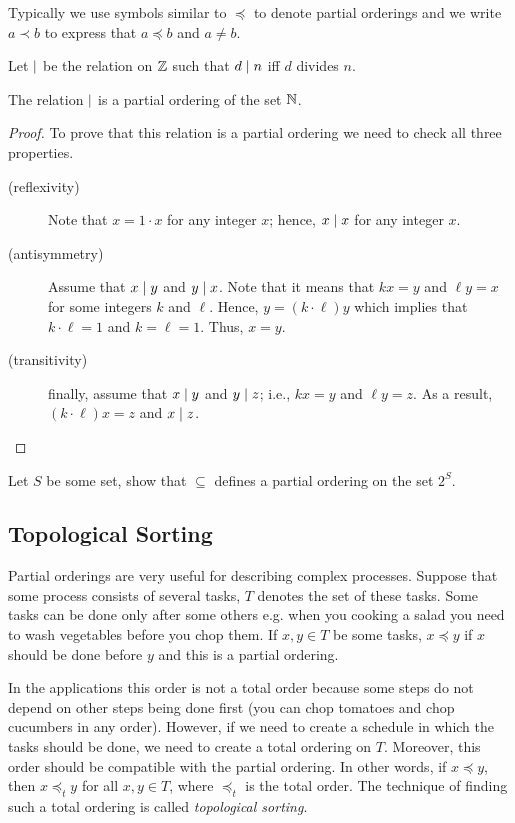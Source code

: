Typically we use symbols similar to $\preceq$ to denote partial orderings and we
write $a \prec b$ to express that $a \preceq b$ and $a \neq b$.

Let $\mid$ be the relation on $\mathbb{Z}$ such that $d \mid n$ iff $d$
divides $n$.
\begin{theorem}
  The relation $\mid$ is a partial ordering of the set $\mathbb{N}$.
\end{theorem}
\begin{proof}
  To prove that this relation is a partial ordering we need to check all three
  properties.
  \begin{description}
    \item[(reflexivity)] Note that $x = 1 \cdot x$ for any integer $x$;
      hence, $x \mid x$ for any integer $x$.
    \item[(antisymmetry)] Assume that $x \mid y$ and $y \mid x$. Note
      that it means that $k x = y$ and $\ell y = x$ for some integers $k$ and
      $\ell$. Hence, $y = (k \cdot \ell) y$ which implies that
      $k \cdot \ell = 1$ and $k = \ell = 1$. Thus, $x = y$.
    \item[(transitivity)] finally, assume that $x \mid y$ and
    $y \mid z$; i.e., $k x = y$ and $\ell y = z$. As a result,
    $(k \cdot \ell) x = z$ and $x \mid z$.
  \end{description}
\end{proof}

\begin{exercise}
  Let $S$ be some set, show that $\subseteq$ defines a partial ordering on the
  set $2^S$.
\end{exercise}

\subsection{Topological Sorting}
Partial orderings are very useful for describing complex processes. Suppose
that some process consists of several tasks, $T$ denotes the set of these tasks.
Some tasks can be done only after some others e.g. when you cooking a salad you
need to wash vegetables before you chop them. If $x, y \in T$ be some tasks, $x
\preceq y$ if $x$ should be done before $y$ and this is a partial ordering.

In the applications this order is not a total order because some steps do not
depend on other steps being done first (you can chop tomatoes and chop
cucumbers in any order). However, if we need to create a schedule in which the
tasks should be done, we need to create a total ordering on $T$. Moreover, this
order should be compatible with the partial ordering. In other words, if $x
\preceq y$, then $x \preceq_t y$ for all $x, y \in T$, where $\preceq_t$ is the
total order. The technique of finding such a total ordering is called
\emph{topological sorting}.

